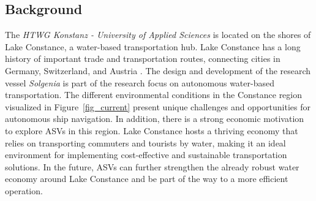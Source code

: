 \subsection{Background}
The \textit{HTWG Konstanz - University of Applied Sciences} is located on the shores of Lake Constance, a water-based transportation hub. Lake Constance has a long history of important trade and transportation routes, connecting cities in Germany, Switzerland, and Austria \citep{Leuzinger.2021}. %
The design and development of the research vessel \textit{Solgenia} is part of the research focus on autonomous water-based transportation. The different environmental conditions in the Constance region visualized in Figure~\ref{fig_current} present unique challenges and opportunities for autonomous ship navigation. 
In addition, there is a strong economic motivation to explore ASVs in this region. Lake Constance hosts a thriving economy that relies on transporting commuters and tourists by water, making it an ideal environment for implementing cost-effective and sustainable transportation solutions.  In the future, ASVs can further strengthen the already robust water economy around Lake Constance and be part of the way to a more efficient operation.

